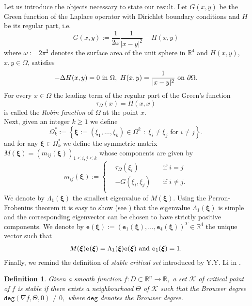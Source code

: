 \documentclass[11pt,a4paper]{amsart}
\newcommand{\ee}{{\mathtt e}}
\newtheorem{definition}[theorem]{Definition}
\theoremstyle{definition}
\renewcommand{\(}{\left(}
\renewcommand{\)}{\right)}
\begin{document}
 Let us introduce the objects necessary to state our result.
 Let $G(x, y)$ be the Green function of the Laplace operator with Dirichlet boundary conditions and $H$ be its regular part, i.e. 
 $$G(x, y):=\frac{1}{2\omega}\frac{1}{|x-y|^{2}}-H(x, y)$$ where $\omega:=2\pi^2$ denotes the surface area of the unit sphere in $\mathbb R^4$ and 
$H(x, y)$, $x, y\in\Omega$, satisfies $$-\Delta H(x, y)=0\ \hbox{in}\ \Omega,\ H(x, y)=\frac{1}{|x-y|^{2}}\ \hbox{on}\  \partial\Omega.$$  
For every $x\in\Omega$ the leading term of the regular part of the Green's function $$\tau_\Omega(x)=H(x,x)$$ is called the {\it Robin function}  of $\Omega$ at the point $x$.\\
Next, given an integer $k\geq 1$ we define
$$\Omega^*_k:=\left\{\boldsymbol\xi:=(\xi_1, \ldots, \xi_k)\in \Omega^k\,\,:\,\, \xi_i\neq \xi_j \,\, \mbox{for}\,\, i\neq j\right\}.$$
and for any $\boldsymbol\xi\in\Omega^*_k$ we define the symmetric matrix $M(\boldsymbol\xi)=\(m_{ij}(\boldsymbol\xi)\)_{1\leq i, j\leq k}$ whose components are given by 
\begin{equation}\label{Mxi}m_{ij}(\boldsymbol\xi):=\left\{\begin{aligned}&\tau_\Omega(\xi_i)\quad \ \ \ \ &\mbox{if}\,\, i=j\\
&-G(\xi_i, \xi_j)\quad &\mbox{if}\,\, i\neq j.\\
\end{aligned}\right.\end{equation}
We denote by $\Lambda_1( \boldsymbol\xi)$ the smallest eigenvalue of $M(\boldsymbol\xi)$.
Using the Perron-Frobenius theorem it is easy to show (see \cite{BLR}) that the eigenvalue $\Lambda_1(\boldsymbol\xi)$ is simple and the corresponding eigenvector can be chosen to
have strictly positive components. We denote by $\boldsymbol\ee(\boldsymbol\xi):=(\ee_1(\boldsymbol\xi), \ldots, \ee_4(\boldsymbol\xi))^T\in\mathbb R^4$ the unique vector such that
\begin{equation}\label{impM}M(\boldsymbol\xi)\boldsymbol\ee(\boldsymbol\xi)=\Lambda_1(\boldsymbol\xi)\boldsymbol\ee(\boldsymbol\xi)\ \hbox{and}\  \boldsymbol\ee_1(\boldsymbol\xi)=1.\end{equation}
\vskip0.2in
Finally, we remind the definition of {\em stable critical set} introduced by Y.Y. Li in \cite{yyl}. 
\begin{definition}\label{yy1}
Given a smooth function $f:D\subset\mathbb R^n\to\mathbb R,$ a set $\mathscr K$ of critical point of $f$ is    stable if there exists a neighbourhood $\Theta$ of $\mathscr K$ such that the Brouwer degree  $\mathtt{deg}(\nabla f,\Theta,0)\not=0,$ where 
$\mathtt{deg}$ denotes  the Brouwer degree. \end{definition}
\end{document}
